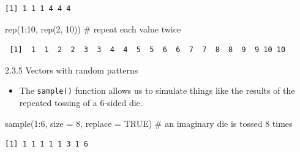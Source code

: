 \documentclass[
  9pt,
  a4paper,
  ignorenonframetext,
  notheorems]{beamer}
\newenvironment{Shaded}{\begin{snugshade}}{\end{snugshade}}
\newcommand{\AttributeTok}[1]{\textcolor[rgb]{0.40,0.45,0.13}{#1}}
\newcommand{\CommentTok}[1]{\textcolor[rgb]{0.37,0.37,0.37}{#1}}
\newcommand{\ConstantTok}[1]{\textcolor[rgb]{0.56,0.35,0.01}{#1}}
\newcommand{\DecValTok}[1]{\textcolor[rgb]{0.68,0.00,0.00}{#1}}
\newcommand{\FunctionTok}[1]{\textcolor[rgb]{0.28,0.35,0.67}{#1}}
\newcommand{\NormalTok}[1]{\textcolor[rgb]{0.00,0.23,0.31}{#1}}
\newcommand{\SpecialCharTok}[1]{\textcolor[rgb]{0.37,0.37,0.37}{#1}}
\providecommand{\tightlist}{%
  \setlength{\itemsep}{0pt}\setlength{\parskip}{0pt}}\usepackage{longtable,booktabs,array}
\begin{document}
\begin{frame}[fragile]
\begin{verbatim}
[1] 1 1 1 4 4 4
\end{verbatim}

\begin{Shaded}
\begin{Highlighting}[]
\FunctionTok{rep}\NormalTok{(}\DecValTok{1}\SpecialCharTok{:}\DecValTok{10}\NormalTok{, }\FunctionTok{rep}\NormalTok{(}\DecValTok{2}\NormalTok{, }\DecValTok{10}\NormalTok{)) }\CommentTok{\# repeat each value twice}
\end{Highlighting}
\end{Shaded}

\begin{verbatim}
 [1]  1  1  2  2  3  3  4  4  5  5  6  6  7  7  8  8  9  9 10 10
\end{verbatim}
\end{frame}

\begin{frame}[fragile]{2.3.5 Vectors with random patterns}
\protect\hypertarget{vectors-with-random-patterns}{}
\begin{itemize}
\tightlist
\item
  The \texttt{sample()} function allows us to simulate things like the
  results of the repeated tossing of a 6-sided die.
\end{itemize}

\begin{Shaded}
\begin{Highlighting}[]
\FunctionTok{sample}\NormalTok{(}\DecValTok{1}\SpecialCharTok{:}\DecValTok{6}\NormalTok{, }\AttributeTok{size =} \DecValTok{8}\NormalTok{, }\AttributeTok{replace =} \ConstantTok{TRUE}\NormalTok{) }\CommentTok{\# an imaginary die is tossed 8 times}
\end{Highlighting}
\end{Shaded}

\begin{verbatim}
[1] 1 1 1 1 1 3 1 6
\end{verbatim}
\end{frame}
\end{document}
